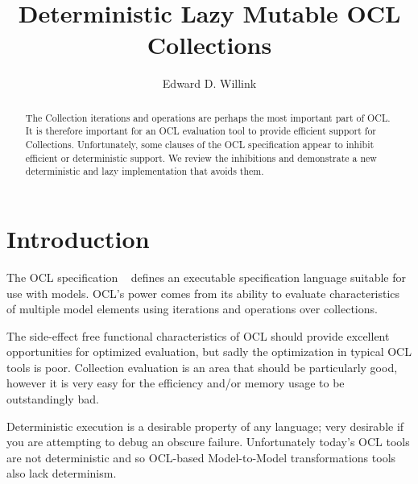 \documentclass{llncs}
\begin{document}
%
\mainmatter              %
%
\title{Deterministic Lazy Mutable OCL Collections}
%
%
\author{Edward D. Willink}
%
%
%


\maketitle              %

\begin{abstract}
The Collection iterations and operations are perhaps the most important part of OCL.
It is therefore important for an OCL evaluation tool to provide efficient support for Collections. Unfortunately, some clauses of the OCL specification appear to inhibit efficient or deterministic support. We review the inhibitions and demonstrate a new deterministic and lazy implementation that avoids them.

\end{abstract}
%
\section{Introduction}
%
The OCL specification ~\cite{OCL-2.4} defines an executable specification language suitable for use with models. OCL's power comes from its ability to evaluate characteristics of multiple model elements using iterations and operations over collections.

The side-effect free functional characteristics of OCL should provide excellent opportunities for optimized evaluation, but sadly the optimization in typical OCL tools is poor. Collection evaluation is an area that should be particularly good, however it is very easy for the efficiency and/or memory usage to be outstandingly bad.

Deterministic execution is a desirable property of any language; very desirable if you are attempting to debug an obscure failure. Unfortunately today's OCL tools are not deterministic and so OCL-based Model-to-Model transformations tools also lack determinism. 
\end{document}
